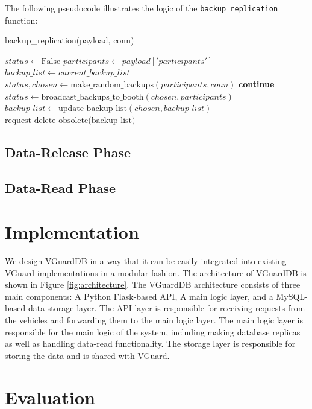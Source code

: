 The following pseudocode illustrates the logic of the \texttt{backup\_replication} function:

\begin{algorithm}[H]
\caption{backup\_replication(payload, conn)}
\begin{algorithmic}
\STATE $status \gets \text{False}$
\STATE $participants \gets payload['participants']$
\STATE $backup\_list \gets current\_backup\_list $
    \STATE $status, chosen \gets \text{make\_random\_backups}(participants, conn)$
        \STATE \textbf{continue}
    \ENDIF
    \STATE $status \gets \text{broadcast\_backups\_to\_booth}(chosen, participants)$
    \STATE $backup\_list \gets \text{update\_backup\_list}(chosen, backup\_list)$
    \STATE $\text{request\_delete\_obsolete(backup\_list)}$
\ENDWHILE
\end{algorithmic}
\end{algorithm}

\subsection{Data-Release Phase}

\subsection{Data-Read Phase}
\section{Implementation}
We design VGuardDB in a way that it can be easily integrated into existing VGuard implementations in a modular fashion. The architecture of VGuardDB is shown in Figure \ref{fig:architecture}. The VGuardDB architecture consists of three main components: A Python Flask-based API, A main logic layer, and a MySQL-based data storage layer. The API layer is responsible for receiving requests from the vehicles and forwarding them to the main logic layer. The main logic layer is responsible for the main logic of the system, including making database replicas as well as handling data-read functionality. The storage layer is responsible for storing the data and is shared with VGuard.


\section{Evaluation}


